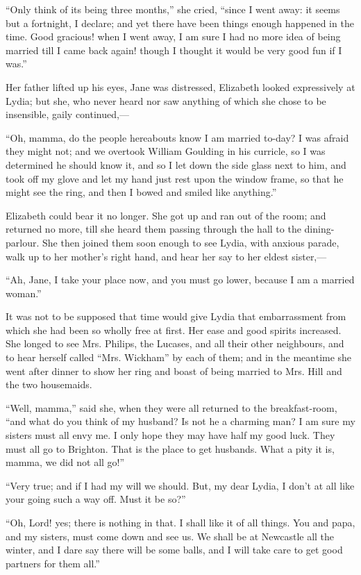 ``Only think of its being three months,'' she cried, ``since I went away: it seems but a fortnight, I declare; and yet there have been things enough happened in the time. Good gracious! when I went away, I am sure I had no more idea of being married till I came back again! though I thought it would be very good fun if I was.''

Her father lifted up his eyes, Jane was distressed, Elizabeth looked expressively at Lydia; but she, who never heard nor saw anything of which she chose to be insensible, gaily continued,---

``Oh, mamma, do the people hereabouts know I am married to-day? I was afraid they might not; and we overtook William Goulding in his curricle, so I was determined he should know it, and so I let down the side glass next to him, and took off my glove and let my hand just rest upon the window frame, so that he might see the ring, and then I bowed and smiled like anything.''

Elizabeth could bear it no longer. She got up and ran out of the room; and returned no more, till she heard them passing through the hall to the dining-parlour. She then joined them soon enough to see Lydia, with anxious parade, walk up to her mother's right hand, and hear her say to her eldest sister,---

``Ah, Jane, I take your place now, and you must go lower, because I am a married woman.''

It was not to be supposed that time would give Lydia that embarrassment from which she had been so wholly free at first. Her ease and good spirits increased. She longed to see Mrs. Philips, the Lucases, and all their other neighbours, and to hear herself called ``Mrs. Wickham'' by each of them; and in the meantime she went after dinner to show her ring and boast of being married to Mrs. Hill and the two housemaids.

``Well, mamma,'' said she, when they were all returned to the breakfast-room, ``and what do you think of my husband? Is not he a charming man? I am sure my sisters must all envy me. I only hope they may have half my good luck. They must all go to Brighton. That is the place to get husbands. What a pity it is, mamma, we did not all go!''

``Very true; and if I had my will we should. But, my dear Lydia, I don't at all like your going such a way off. Must it be so?''

``Oh, Lord! yes; there is nothing in that. I shall like it of all things. You and papa, and my sisters, must come down and see us. We shall be at Newcastle all the winter, and I dare say there will be some balls, and I will take care to get good partners for them all.''

